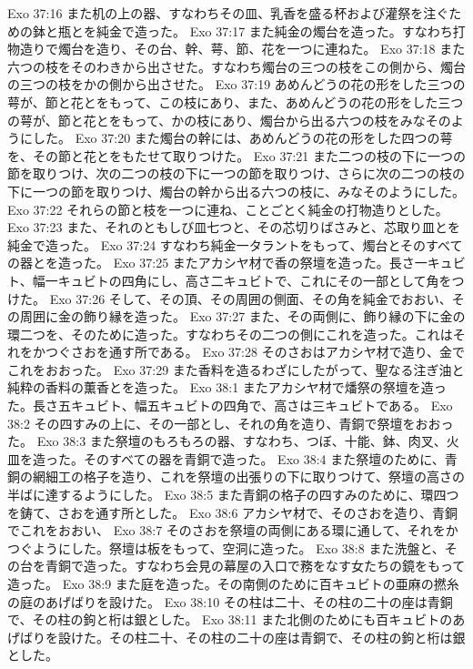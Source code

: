 Exo 37:16  また机の上の器、すなわちその皿、乳香を盛る杯および灌祭を注ぐための鉢と瓶とを純金で造った。
Exo 37:17  また純金の燭台を造った。すなわち打物造りで燭台を造り、その台、幹、萼、節、花を一つに連ねた。
Exo 37:18  また六つの枝をそのわきから出させた。すなわち燭台の三つの枝をこの側から、燭台の三つの枝をかの側から出させた。
Exo 37:19  あめんどうの花の形をした三つの萼が、節と花とをもって、この枝にあり、また、あめんどうの花の形をした三つの萼が、節と花とをもって、かの枝にあり、燭台から出る六つの枝をみなそのようにした。
Exo 37:20  また燭台の幹には、あめんどうの花の形をした四つの萼を、その節と花とをもたせて取りつけた。
Exo 37:21  また二つの枝の下に一つの節を取りつけ、次の二つの枝の下に一つの節を取りつけ、さらに次の二つの枝の下に一つの節を取りつけ、燭台の幹から出る六つの枝に、みなそのようにした。
Exo 37:22  それらの節と枝を一つに連ね、ことごとく純金の打物造りとした。
Exo 37:23  また、それのともしび皿七つと、その芯切りばさみと、芯取り皿とを純金で造った。
Exo 37:24  すなわち純金一タラントをもって、燭台とそのすべての器とを造った。
Exo 37:25  またアカシヤ材で香の祭壇を造った。長さ一キュビト、幅一キュビトの四角にし、高さ二キュビトで、これにその一部として角をつけた。
Exo 37:26  そして、その頂、その周囲の側面、その角を純金でおおい、その周囲に金の飾り縁を造った。
Exo 37:27  また、その両側に、飾り縁の下に金の環二つを、そのために造った。すなわちその二つの側にこれを造った。これはそれをかつぐさおを通す所である。
Exo 37:28  そのさおはアカシヤ材で造り、金でこれをおおった。
Exo 37:29  また香料を造るわざにしたがって、聖なる注ぎ油と純粋の香料の薫香とを造った。
Exo 38:1  またアカシヤ材で燔祭の祭壇を造った。長さ五キュビト、幅五キュビトの四角で、高さは三キュビトである。
Exo 38:2  その四すみの上に、その一部とし、それの角を造り、青銅で祭壇をおおった。
Exo 38:3  また祭壇のもろもろの器、すなわち、つぼ、十能、鉢、肉叉、火皿を造った。そのすべての器を青銅で造った。
Exo 38:4  また祭壇のために、青銅の網細工の格子を造り、これを祭壇の出張りの下に取りつけて、祭壇の高さの半ばに達するようにした。
Exo 38:5  また青銅の格子の四すみのために、環四つを鋳て、さおを通す所とした。
Exo 38:6  アカシヤ材で、そのさおを造り、青銅でこれをおおい、
Exo 38:7  そのさおを祭壇の両側にある環に通して、それをかつぐようにした。祭壇は板をもって、空洞に造った。
Exo 38:8  また洗盤と、その台を青銅で造った。すなわち会見の幕屋の入口で務をなす女たちの鏡をもって造った。
Exo 38:9  また庭を造った。その南側のために百キュビトの亜麻の撚糸の庭のあげばりを設けた。
Exo 38:10  その柱は二十、その柱の二十の座は青銅で、その柱の鉤と桁は銀とした。
Exo 38:11  また北側のためにも百キュビトのあげばりを設けた。その柱二十、その柱の二十の座は青銅で、その柱の鉤と桁は銀とした。
